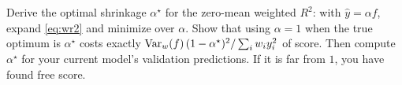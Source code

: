 \begin{drillbox}
Derive the optimal shrinkage $\alpha^\star$ for the zero-mean weighted
$R^2$: with $\hat y = \alpha f$, expand \eqref{eq:wr2} and minimize over
$\alpha$. Show that using $\alpha=1$ when the true optimum is $\alpha^\star$
costs exactly $\operatorname{Var}_w(f)\,(1-\alpha^\star)^2 / \sum_i w_i y_i^2$ of score.
Then compute $\alpha^\star$ for your current model's validation predictions.
If it is far from $1$, you have found free score.
\end{drillbox}

